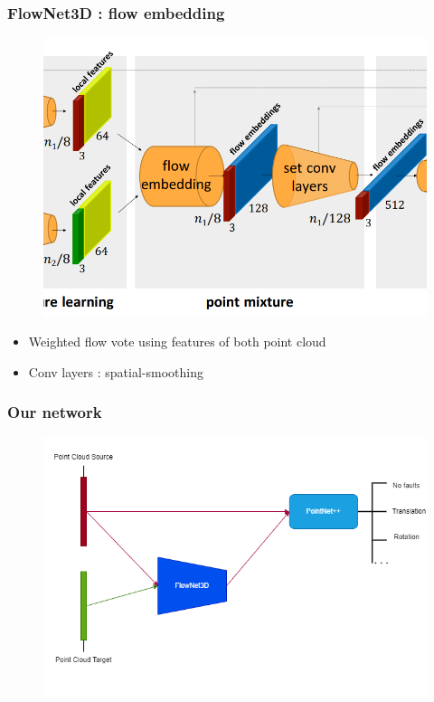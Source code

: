 \documentclass{beamer}
\begin{document}
\begin{frame}[allowframebreaks]
\frametitle{FlowNet3D : flow embedding}
\begin{minipage}{\textwidth}
\begin{minipage}{0.45\textwidth}
        \begin{figure}
        \centering        \includegraphics[width=\textwidth,height=0.8\textheight,keepaspectratio]{img/05_FlowNet3D_point_mixture.png}        
        \label{fig:enter-label}
    \end{figure}
    \end{minipage}
    \hfill
    \begin{minipage}{0.45\textwidth}
        \begin{itemize}
            \item Weighted flow vote using features of both point cloud
            \item Conv layers : spatial-smoothing
        \end{itemize}
    \end{minipage} 
\end{minipage}
\end{frame}

\begin{frame}[t,allowframebreaks]
    \frametitle{Our network}
    \begin{figure}
        \centering
        \includegraphics[scale=0.35]{img/05_OurNetwork.png}
        \label{fig:enter-label}
    \end{figure}
\end{frame}
\end{document}
